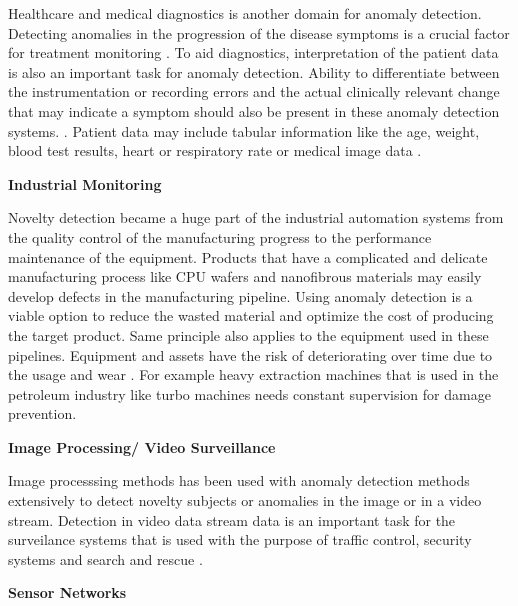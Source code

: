 Healthcare and medical diagnostics is another domain for anomaly detection. Detecting anomalies in
the progression of the disease symptoms is a crucial factor for treatment monitoring
\cite{Schlegl2017UnsupervisedAD}. To aid diagnostics, interpretation of the patient data is also an
important task for anomaly detection. Ability to differentiate between the instrumentation or
recording errors and the actual clinically relevant change that may indicate a symptom should also
be present in these anomaly detection systems. \cite{Pimentel:2014:RRN:2588908.2589196}. Patient
data may include tabular information like the age, weight, blood test results, heart or
respiratory rate \cite{inproceedings_medical}\cite{Markou:2003:NDR:959414.959416} or medical image data
\cite{Schlegl2017UnsupervisedAD}. 

\textbf{ Industrial Monitoring}

Novelty detection became a huge part of the industrial automation systems from the quality control
of the manufacturing progress to the performance maintenance of the equipment. Products that have
a complicated and delicate manufacturing process like CPU wafers \cite{Kim:2012:MLN:2076800.2076903} and nanofibrous
materials \cite{Napoletano2018anomaly} may easily develop defects in the manufacturing pipeline. Using
anomaly detection is a viable option to reduce the wasted material and optimize the cost of
producing the target product. Same principle also applies to the equipment used in these pipelines.
Equipment and assets have the risk of deteriorating over time due to the usage
and wear \cite{Pimentel:2014:RRN:2588908.2589196}. For example heavy extraction machines that is used in the
petroleum industry like turbo machines \cite{s150202774} needs constant supervision for damage
prevention. 

\textbf{ Image Processing/ Video Surveillance}

Image processsing methods has been used with anomaly detection methods extensively to detect novelty
subjects or anomalies in the image or in a video stream. Detection in video data stream data is an
important task for the surveilance systems that is used with the purpose of traffic control,
security systems and search and rescue \cite{image_anomaly}.

\textbf{ Sensor Networks}


